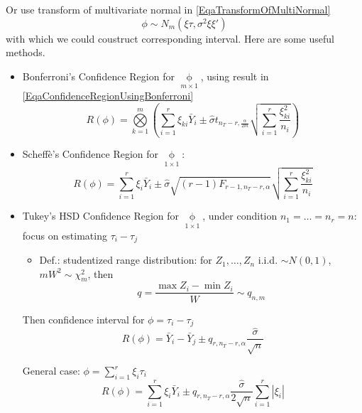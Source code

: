     Or use transform of multivariate normal in \autoref{EqaTransformOfMultiNormal}
    \begin{equation}
         \phi \sim N_m(\xi \tau,\sigma ^2\xi \xi ')
    \end{equation}
    with which we could coustruct corresponding interval. Here are some useful methods. 
\begin{itemize}[topsep=2pt,itemsep=0pt]    
    
    \item Bonferroni's Confidence Region for $ \mathop{\phi}\limits_{m\times 1}  $, using result in \autoref{EqaConfidenceRegionUsingBonferroni}
    \begin{equation}
        R(\phi )= \bigotimes\limits_{k=1}^m\left(\sum_{i=1}^r\xi _{ki}\bar{Y}_i \pm \hat{\sigma }t_{n_T-r,\frac{\alpha }{2m}} \sqrt{\sum_{i=1}^r\dfrac{\xi _{ki}^2}{n_i}} \right)
    \end{equation}
    
    \item Scheff\`{e}'s Confidence Region for $ \mathop{\phi }\limits_{1\times 1} $:
    \begin{equation}
         R(\phi)=\sum_{i=1}^r\xi_i\bar{Y}_i\pm \hat{\sigma }\sqrt{(r-1)F_{r-1,n_T-r,\alpha }}\sqrt{\sum_{i=1}^r\dfrac{\xi _{ki}^2}{n_i}}
    \end{equation}
    
    \item {}Tukey's HSD Confidence Region for $ \mathop{\phi }\limits_{1\times 1} $, under condition $ n_1=\ldots=n_r=n $: focus on estimating $ \tau_i-\tau_j $
    
    \begin{itemize}[topsep=2pt,itemsep=0pt]
        \item Def.: studentized range \hypertarget{TukeyStudentizedRangeDistribution}{}distribution: for $ Z_1,\ldots,Z_n $ i.i.d. $ \sim N(0 ,1) $, $ mW^2\sim \chi _m^2 $, then 
        \begin{equation}\label{EqaTukeyStudentizedRangeDistribution}
            q=\dfrac{\max Z_i-\min Z_i}{W}\sim q_{n,m} 
        \end{equation}
    \end{itemize}
    
    Then confidence interval for $ \phi =\tau_i-\tau_j $ 
    \begin{equation}
        R(\phi )=\bar{Y}_i-\bar{Y}_j\pm q_{r,n_T-r,\alpha }\dfrac{\hat{\sigma }}{\sqrt{n}}
    \end{equation}
    
    General case: $ \phi =\sum_{i=1}^r\xi _i\tau_i $
    \begin{equation}
        R(\phi )=\sum_{i=1}^r\xi _i\bar{Y}_i\pm q_{r,n_T-r,\alpha }\dfrac{\hat{\sigma }}{2\sqrt{n}}\sum_{i=1}^r|\xi _i|
    \end{equation}
    
     
\end{itemize}

